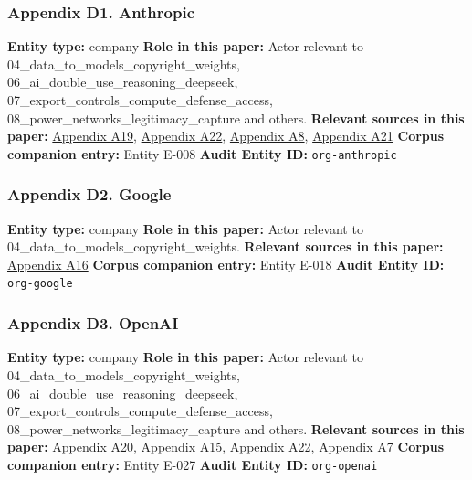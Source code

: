 \documentclass[
  american,
  11pt,
  letterpaper,
]{article}
\begin{document}
\subsubsection{Appendix D1.
Anthropic}\label{ch-10-appendix-d1-anthropic}

\textbf{Entity type:} company \textbf{Role in this paper:} Actor
relevant to 04\_data\_to\_models\_copyright\_weights,
06\_ai\_double\_use\_reasoning\_deepseek,
07\_export\_controls\_compute\_defense\_access,
08\_power\_networks\_legitimacy\_capture and others. \textbf{Relevant
sources in this paper:}
\hyperref[ch-10-appendix-a19-bartz-et-al-v-anthropic-pbc-order-on-fair-use]{Appendix
A19},
\hyperref[ch-10-appendix-a22-anthropic-outspends-openai-in-biggest-ever-lobbying-quarter]{Appendix
A22},
\hyperref[ch-10-appendix-a8-claude-gov-models-for-u-s-national-security-customers]{Appendix
A8},
\hyperref[ch-10-appendix-a21-anthropic-and-palantir-partner-to-bring-claude-ai-models-to-aws-for-u-s-government-intelligence-and-defense-operations]{Appendix
A21} \textbf{Corpus companion entry:} Entity E-008 \textbf{Audit Entity
ID:} \texttt{org-anthropic}

\subsubsection{Appendix D2. Google}\label{ch-10-appendix-d2-google}

\textbf{Entity type:} company \textbf{Role in this paper:} Actor
relevant to 04\_data\_to\_models\_copyright\_weights. \textbf{Relevant
sources in this paper:}
\hyperref[ch-10-appendix-a16-reddit-strikes-60m-deal-allowing-google-to-train-ai-models-on-its-posts-unveils-ipo-plans]{Appendix
A16} \textbf{Corpus companion entry:} Entity E-018 \textbf{Audit Entity
ID:} \texttt{org-google}

\subsubsection{Appendix D3. OpenAI}\label{ch-10-appendix-d3-openai}

\textbf{Entity type:} company \textbf{Role in this paper:} Actor
relevant to 04\_data\_to\_models\_copyright\_weights,
06\_ai\_double\_use\_reasoning\_deepseek,
07\_export\_controls\_compute\_defense\_access,
08\_power\_networks\_legitimacy\_capture and others. \textbf{Relevant
sources in this paper:}
\hyperref[ch-10-appendix-a20-openais-proposals-for-the-us-ai-action-plan]{Appendix
A20},
\hyperref[ch-10-appendix-a15-language-models-are-unsupervised-multitask-learners]{Appendix
A15},
\hyperref[ch-10-appendix-a22-anthropic-outspends-openai-in-biggest-ever-lobbying-quarter]{Appendix
A22},
\hyperref[ch-10-appendix-a7-introducing-openai-for-government]{Appendix
A7} \textbf{Corpus companion entry:} Entity E-027 \textbf{Audit Entity
ID:} \texttt{org-openai}
\end{document}
